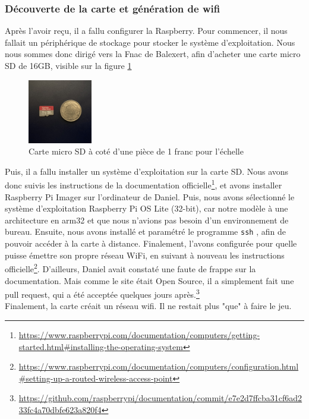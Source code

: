 \documentclass[a4paper]{article}
\begin{document}
\subsubsection{Découverte de la carte et génération de wifi}
Après l'avoir reçu, il a fallu configurer la Raspberry. Pour commencer, il nous fallait un périphérique de stockage pour stocker le système d'exploitation. Nous nous sommes donc dirigé vers la Fnac de Balexert, afin d'acheter une carte micro SD de 16GB, visible sur la figure \ref{fig:microsd}
\begin{figure}
    \centering
    \includegraphics[width=0.25\textwidth]{images/hardware/microSD.jpeg}
    \caption{Carte micro SD à coté d'une pièce de 1 franc pour l'échelle}
    \label{fig:microsd}
\end{figure}
Puis, il a fallu installer un système d'exploitation sur la carte SD. Nous avons donc suivis les instructions de la documentation officielle\footnote{\url{https://www.raspberrypi.com/documentation/computers/getting-started.html\#installing-the-operating-system}}, et avons installer Raspberry Pi Imager sur l'ordinateur de Daniel. Puis, nous avons sélectionné le système d'exploitation Raspberry Pi OS Lite (32-bit), car notre modèle à une architecture en arm32\cite{arm32} et que nous n'avions pas besoin d'un environnement de bureau\cite{desktopenv}. Ensuite, nous avons installé et paramétré le programme \texttt{ssh} \cite{ssh}, afin de pouvoir accéder à la carte à distance. Finalement, l'avons configurée pour quelle puisse émettre son propre réseau WiFi, en suivant à nouveau les instructions officielle\footnote{\url{https://www.raspberrypi.com/documentation/computers/configuration.html\#setting-up-a-routed-wireless-access-point}}. D'ailleurs, Daniel avait constaté une faute de frappe sur la documentation. Mais comme le site était Open Source\cite{opensource}, il a simplement fait une pull request, qui a été acceptée quelques jours après.\footnote{\url{https://github.com/raspberrypi/documentation/commit/e7e2d7ffcba31cf6ad233fc4a70dbfe623a820f4}} \\
Finalement, la carte créait un réseau wifi. Il ne restait plus "que" à faire le jeu. 
\end{document}
